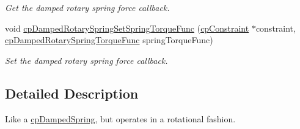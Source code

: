\begin{DoxyCompactItemize}
\begin{DoxyCompactList}\small\item\em Get the damped rotary spring force callback. \end{DoxyCompactList}\item 
\hypertarget{group__cp_damped_rotary_spring_gaa8c826ebe6efef68b62edf4459bf98af}{}void \hyperlink{group__cp_damped_rotary_spring_gaa8c826ebe6efef68b62edf4459bf98af}{cp\+Damped\+Rotary\+Spring\+Set\+Spring\+Torque\+Func} (\hyperlink{structcp_constraint}{cp\+Constraint} $\ast$constraint, \hyperlink{group__cp_damped_rotary_spring_ga072c236959020fab4f30087b5234040b}{cp\+Damped\+Rotary\+Spring\+Torque\+Func} spring\+Torque\+Func)\label{group__cp_damped_rotary_spring_gaa8c826ebe6efef68b62edf4459bf98af}

\begin{DoxyCompactList}\small\item\em Set the damped rotary spring force callback. \end{DoxyCompactList}\end{DoxyCompactItemize}


\subsection{Detailed Description}
Like a \hyperlink{structcp_damped_spring}{cp\+Damped\+Spring}, but operates in a rotational fashion. 

